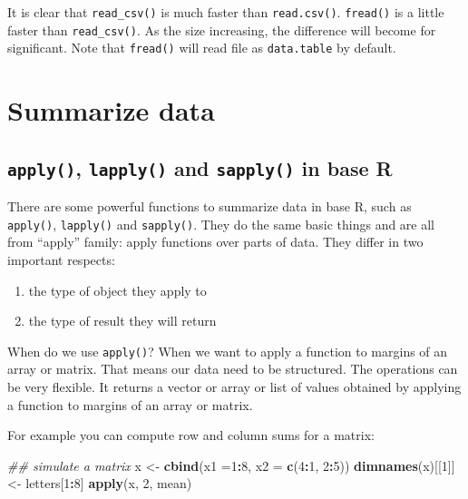 \documentclass[12pt,]{krantz}
\makeatletter
\newenvironment{Shaded}{\begin{snugshade}}{\end{snugshade}}
\newcommand{\CommentTok}[1]{\textcolor[rgb]{0.37,0.37,0.37}{\textit{#1}}}
\newcommand{\DataTypeTok}[1]{\textcolor[rgb]{0.27,0.27,0.27}{#1}}
\newcommand{\DecValTok}[1]{\textcolor[rgb]{0.06,0.06,0.06}{#1}}
\newcommand{\KeywordTok}[1]{\textcolor[rgb]{0.27,0.27,0.27}{\textbf{#1}}}
\newcommand{\NormalTok}[1]{#1}
\newcommand{\OperatorTok}[1]{\textcolor[rgb]{0.43,0.43,0.43}{\textbf{#1}}}
\newcommand{\StringTok}[1]{\textcolor[rgb]{0.5,0.5,0.5}{#1}}
\providecommand{\tightlist}{%
  \setlength{\itemsep}{0pt}\setlength{\parskip}{0pt}}
\newenvironment{kframe}{%
\medskip{}
\setlength{\fboxsep}{.8em}
 \def\at@end@of@kframe{}%
 \ifinner\ifhmode%
  \def\at@end@of@kframe{\end{minipage}}%
  \begin{minipage}{\columnwidth}%
 \fi\fi%
 \def\FrameCommand##1{\hskip\@totalleftmargin \hskip-\fboxsep
 \colorbox{shadecolor}{##1}\hskip-\fboxsep
     \hskip-\linewidth \hskip-\@totalleftmargin \hskip\columnwidth}%
 \MakeFramed {\advance\hsize-\width
   \@totalleftmargin\z@ \linewidth\hsize
   \@setminipage}}%
 {\par\unskip\endMakeFramed%
 \at@end@of@kframe}
\renewenvironment{Shaded}{\begin{kframe}}{\end{kframe}}
\makeatother
\begin{document}
It is clear that \texttt{read\_csv()} is much faster than \texttt{read.csv()}. \texttt{fread()} is a little faster than \texttt{read\_csv()}. As the size increasing, the difference will become for significant. Note that \texttt{fread()} will read file as \texttt{data.table} by default.

\hypertarget{summarize-data}{%
\section{Summarize data}\label{summarize-data}}

\hypertarget{apply-lapply-and-sapply-in-base-r}{%
\subsection{\texorpdfstring{\texttt{apply()}, \texttt{lapply()} and \texttt{sapply()} in base R}{apply(), lapply() and sapply() in base R}}\label{apply-lapply-and-sapply-in-base-r}}

There are some powerful functions to summarize data in base R, such as \texttt{apply()}, \texttt{lapply()} and \texttt{sapply()}. They do the same basic things and are all from ``apply'' family: apply functions over parts of data. They differ in two important respects:

\begin{enumerate}
\def\labelenumi{\arabic{enumi}.}
\tightlist
\item
  the type of object they apply to
\item
  the type of result they will return
\end{enumerate}

When do we use \texttt{apply()}? When we want to apply a function to margins of an array or matrix. That means our data need to be structured. The operations can be very flexible. It returns a vector or array or list of values obtained by applying a function to margins of an array or matrix.

For example you can compute row and column sums for a matrix:

\begin{Shaded}
\begin{Highlighting}[]
\CommentTok{## simulate a matrix}
\NormalTok{x <-}\StringTok{ }\KeywordTok{cbind}\NormalTok{(}\DataTypeTok{x1 =}\DecValTok{1}\OperatorTok{:}\DecValTok{8}\NormalTok{, }\DataTypeTok{x2 =} \KeywordTok{c}\NormalTok{(}\DecValTok{4}\OperatorTok{:}\DecValTok{1}\NormalTok{, }\DecValTok{2}\OperatorTok{:}\DecValTok{5}\NormalTok{))}
\KeywordTok{dimnames}\NormalTok{(x)[[}\DecValTok{1}\NormalTok{]] <-}\StringTok{ }\NormalTok{letters[}\DecValTok{1}\OperatorTok{:}\DecValTok{8}\NormalTok{]}
\KeywordTok{apply}\NormalTok{(x, }\DecValTok{2}\NormalTok{, mean)}
\end{Highlighting}
\end{Shaded}
\end{document}
